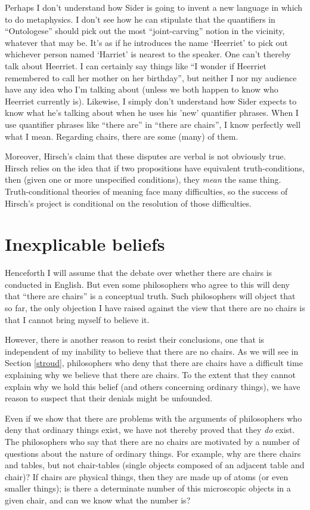 \documentclass[11pt]{article}
\begin{document}
\begin{spacing}{1.25}
Perhaps I don't understand how Sider is going to invent a new language
in which to do metaphysics.  I don't see how he can stipulate that the
quantifiers in ``Ontologese'' should pick out the most
``joint-carving'' notion in the vicinity, whatever that may be.  It's
as if he introduces the name `Heerriet' to pick out whichever person
named `Harriet' is nearest to the speaker.  One can't thereby talk
about Heerriet.  I can certainly say things like ``I wonder if
Heerriet remembered to call her mother on her birthday'', but neither
I nor my audience have any idea who I'm talking about (unless we both
happen to know who Heerriet currently is).  Likewise, I simply don't
understand how Sider expects to know what he's talking about when he
uses his 'new' quantifier phrases.  When I use quantifier phrases like
``there are'' in ``there are chairs'', I know perfectly well what I
mean.  Regarding chairs, there are some (many) of them.

Moreover, Hirsch's claim that these disputes are verbal is not
obviously true.  Hirsch relies on the idea that if two propositions
have equivalent truth-conditions, then (given one or more unspecified
conditions), they {\em mean} the same thing.  Truth-conditional
theories of meaning face many difficulties, so the success of Hirsch's
project is conditional on the resolution of those difficulties.

\section{Inexplicable beliefs}
Henceforth I will assume that the debate over whether there are chairs
is conducted in English.  But even some philosophers who agree to this
will deny that ``there are chairs'' is a conceptual truth.  Such
philosophers will object that so far, the only objection I have raised
against the view that there are no chairs is that I cannot bring
myself to believe it.

However, there is another reason to resist their conclusions, one that
is independent of my inability to believe that there are no chairs.
As we will see in Section \ref{stroud}, philosophers who deny that
there are chairs have a difficult time explaining why we believe that
there are chairs.  To the extent that they cannot explain why we hold
this belief (and others concerning ordinary things), we have reason to
suspect that their denials might be unfounded.

Even if we show that there are problems with the arguments of
philosophers who deny that ordinary things exist, we have not thereby
proved that they {\em do} exist.  The philosophers who say that there
are no chairs are motivated by a number of questions about the nature
of ordinary things.  For example, why are there chairs and tables, but
not chair-tables (single objects composed of an adjacent table and
chair)?  If chairs are physical things, then they are made up of atoms
(or even smaller things); is there a determinate number of this
microscopic objects in a given chair, and can we know what the number
is?


\end{spacing}
\end{document}
